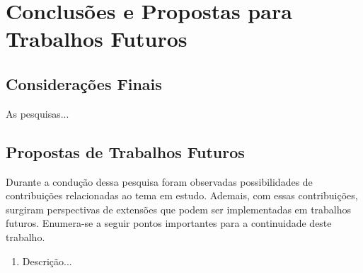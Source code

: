 \chapter{Conclusões e Propostas para Trabalhos Futuros}
%
\label{cap:conc} \vspace{-1cm} \vspace{1cm}
%

\section{Considerações Finais} 
%
\label{sec:conc_resumo}
%
\par 
As pesquisas...
%
\section{Propostas de Trabalhos Futuros} 
%
\label{sec:conc_future}
%
Durante a condução dessa pesquisa foram observadas possibilidades de contribuições relacionadas ao tema em estudo. Ademais, com essas contribuições, surgiram perspectivas de extensões que podem ser implementadas em trabalhos futuros. Enumera-se a seguir pontos importantes para a continuidade deste trabalho. 
\begin{enumerate}
	\item Descrição...
\end{enumerate}


%
\clearpage
%